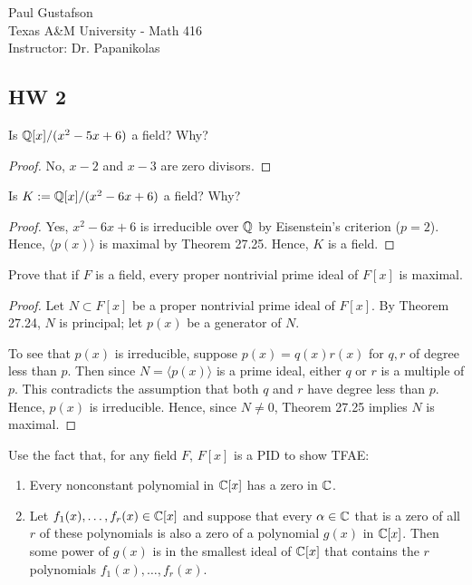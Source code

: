 \documentclass{article}
\begin{document}
\noindent Paul Gustafson\\
\noindent Texas A\&M University - Math 416\\
\noindent Instructor: Dr. Papanikolas

\subsection*{HW 2}

 Is $\mathbb{Q}[x]/(x^2 - 5x + 6)$ a field? Why?
\begin{proof}
No, $x-2$ and $x-3$ are zero divisors.
\end{proof}
 Is $K := \mathbb{Q}[x]/(x^2 - 6x + 6)$ a field? Why?
\begin{proof}
Yes, $x^2 -6x + 6$ is irreducible over $\mathbb{Q}$ by Eisenstein's criterion ($p=2$). Hence, $\langle p(x)\rangle$ is maximal by Theorem 27.25. Hence, $K$ is a field.
\end{proof}
 Prove that if $F$ is a field, every proper nontrivial prime ideal of $F[x]$ is maximal.
\begin{proof} 
Let $N \subset F[x]$ be a proper nontrivial prime ideal of $F[x]$. By Theorem 27.24, $N$ is principal; let $p(x)$ be a generator of $N$. 

To see that $p(x)$ is irreducible, suppose $ p(x) = q(x) r(x)$ for $q,r$ of degree less than $p$.  Then since $N = \langle p(x) \rangle$ is a prime ideal, either $q$ or $r$ is a multiple of $p$. This contradicts the assumption that both $q$ and $r$ have degree less than $p$. Hence, $p(x)$ is irreducible. Hence, since $N \ne 0$, Theorem 27.25 implies $N$ is maximal.
\end{proof}
 Use the fact that, for any field $F$, $F[x]$ is a PID to show TFAE:
\begin{enumerate}
\item Every nonconstant polynomial in $\mathbb{C}[x]$ has a zero in $\mathbb{C}$.
\item Let $f_1(x), \ldots, f_r(x) \in \mathbb{C}[x]$ and suppose that every $\alpha \in \mathbb{C}$ that is a zero of all $r$ of these polynomials is also a zero of a polynomial $g(x)$ in $\mathbb{C}[x]$. Then some power of $g(x)$ is in the smallest ideal of $\mathbb{C}[x]$ that contains the $r$ polynomials $f_1(x), \ldots, f_r(x)$.
\end{enumerate}
\end{document}
